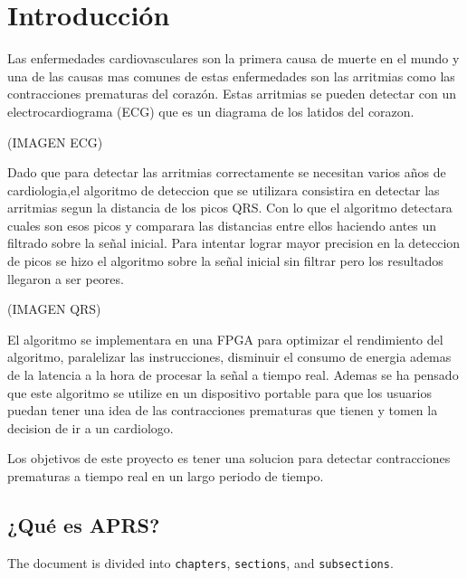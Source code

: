\titlespacing*{\chapter}{0pt}{-1.25cm}{25pt}
\chapter{Introducción}
Las enfermedades cardiovasculares son la primera causa de muerte en el mundo y una de las causas mas comunes
de estas enfermedades son las arritmias como las contracciones prematuras del corazón. Estas arritmias se 
pueden detectar con un electrocardiograma (ECG) que es un diagrama de los latidos del corazon.

(IMAGEN ECG)

Dado que para detectar las arritmias correctamente se necesitan varios años de cardiologia,el algoritmo de 
deteccion que se utilizara consistira en detectar las arritmias segun la distancia de los picos QRS. Con lo
que el algoritmo detectara cuales son esos picos y comparara las distancias entre ellos haciendo antes un 
filtrado sobre la señal inicial. Para intentar lograr mayor precision en la deteccion de picos se hizo el 
algoritmo sobre la señal inicial sin filtrar pero los resultados llegaron a ser peores.  

(IMAGEN QRS)

El algoritmo se implementara en una FPGA para optimizar el rendimiento del algoritmo, paralelizar 
las instrucciones, disminuir el consumo de energia ademas de la latencia a la hora de procesar la señal a tiempo real.
Ademas se ha pensado que este algoritmo se utilize en un dispositivo portable para que los usuarios puedan
tener una idea de las contracciones prematuras que tienen y tomen la decision de ir a un cardiologo.

Los objetivos de este proyecto es tener una solucion para detectar contracciones prematuras a tiempo real en un largo periodo 
de tiempo.


\section{¿Qué es APRS?}
		The document is divided into \texttt{chapters}, \texttt{sections}, and \texttt{subsections}.

